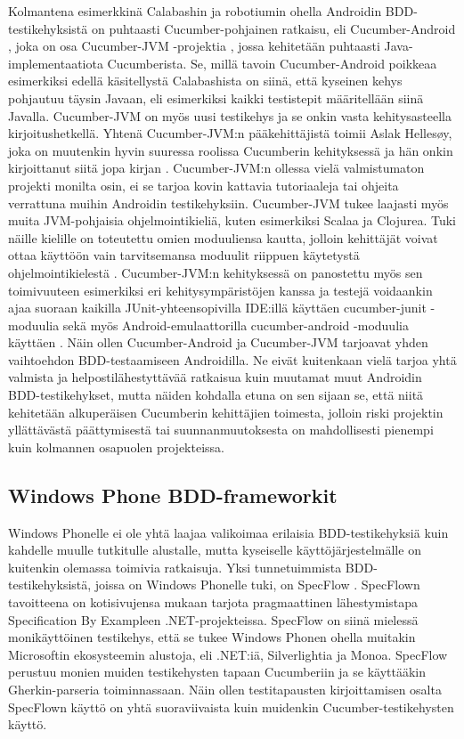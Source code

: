 \documentclass[finnish,nonumbib,nocopyright]{gradu2}
\begin{document}
Kolmantena esimerkkinä Calabashin ja robotiumin ohella Androidin BDD-testikehyksistä on puhtaasti Cucumber-pohjainen ratkaisu, eli Cucumber-Android \cite{cucumberandroid}, joka on osa Cucumber-JVM -projektia \cite{cucumberjvm}, jossa kehitetään puhtaasti Java-implementaatiota Cucumberista. Se, millä tavoin Cucumber-Android poikkeaa esimerkiksi edellä käsitellystä Calabashista on siinä, että kyseinen kehys pohjautuu täysin Javaan, eli esimerkiksi kaikki testistepit määritellään siinä Javalla. Cucumber-JVM on myös uusi testikehys ja se onkin vasta kehitysasteella kirjoitushetkellä. Yhtenä Cucumber-JVM:n pääkehittäjistä toimii Aslak Hellesøy, joka on muutenkin hyvin suuressa roolissa Cucumberin kehityksessä ja hän onkin kirjoittanut siitä jopa kirjan \cite{cucumberbook}. Cucumber-JVM:n ollessa vielä valmistumaton projekti monilta osin, ei se tarjoa kovin kattavia tutoriaaleja tai ohjeita verrattuna muihin Androidin testikehyksiin. Cucumber-JVM tukee laajasti myös muita JVM-pohjaisia ohjelmointikieliä, kuten esimerkiksi Scalaa ja Clojurea. Tuki näille kielille on toteutettu omien moduuliensa kautta, jolloin kehittäjät voivat ottaa käyttöön vain tarvitsemansa moduulit riippuen käytetystä ohjelmointikielestä \cite{cucumberjvm}. Cucumber-JVM:n kehityksessä on panostettu myös sen toimivuuteen esimerkiksi eri kehitysympäristöjen kanssa ja testejä voidaankin ajaa suoraan kaikilla JUnit-yhteensopivilla IDE:illä käyttäen cucumber-junit -moduulia sekä myös Android-emulaattorilla cucumber-android -moduulia käyttäen \cite{cucumberjvm}. Näin ollen Cucumber-Android ja Cucumber-JVM tarjoavat yhden vaihtoehdon BDD-testaamiseen Androidilla. Ne eivät kuitenkaan vielä tarjoa yhtä valmista ja helpostilähestyttävää ratkaisua kuin muutamat muut Androidin BDD-testikehykset, mutta näiden kohdalla etuna on sen sijaan se, että niitä kehitetään alkuperäisen Cucumberin kehittäjien toimesta, jolloin riski projektin yllättävästä päättymisestä tai suunnanmuutoksesta on mahdollisesti pienempi kuin kolmannen osapuolen projekteissa. 

\subsection{Windows Phone BDD-frameworkit}
Windows Phonelle ei ole yhtä laajaa valikoimaa erilaisia BDD-testikehyksiä kuin kahdelle muulle tutkitulle alustalle, mutta kyseiselle käyttöjärjestelmälle on kuitenkin olemassa toimivia ratkaisuja. Yksi tunnetuimmista BDD-testikehyksistä, joissa on Windows Phonelle tuki, on SpecFlow \cite{specflow}. SpecFlown tavoitteena on kotisivujensa mukaan \cite{specflow} tarjota pragmaattinen lähestymistapa Specification By Exampleen \cite{specification} .NET-projekteissa. SpecFlow on siinä mielessä monikäyttöinen testikehys, että se tukee Windows Phonen ohella muitakin Microsoftin ekosysteemin alustoja, eli .NET:iä, Silverlightia ja Monoa. SpecFlow perustuu monien muiden testikehysten tapaan Cucumberiin ja se käyttääkin Gherkin-parseria toiminnassaan. Näin ollen testitapausten kirjoittamisen osalta SpecFlown käyttö on yhtä suoraviivaista kuin muidenkin Cucumber-testikehysten käyttö.
\end{document}
